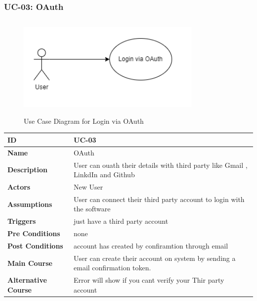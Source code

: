     \subsubsection{UC-03: OAuth}
    \begin{figure}[H]
        \includegraphics[height=5cm, width=0.8\textwidth]{./diagrams/Use Case/u3.png}
        \centering 
        \caption{Use Case Diagram for Login via OAuth}
        \label{Usecase1}
        \end{figure}
        
    \begin{center}
        \begin{tabularx}{\textwidth}{|l|X|}
            \hline
            \textbf{ID} & UC-03 \\
            \hline
            \textbf{Name} & OAuth \\
            \hline
            \textbf{Description} & User can ouath their details with third party like Gmail , LinkdIn and Github \\
            \hline
            \textbf{Actors} & New User \\
            \hline
            \textbf{Assumptions} & User can connect their third party account to login with the software \\
            \hline
            \textbf{Triggers} & just have a third party account  \\
            \hline
            \textbf{Pre Conditions} & none \\
            \hline
            \textbf{Post Conditions} & account has created by confiramtion through email  \\
            \hline
            \textbf{Main Course} & User can create their account on system by sending a email confirmation token. \\
            \hline
            \textbf{Alternative Course} & Error will show if you cant verify your Thir party account \\
            \hline
            
        \end{tabularx}
    \end{center}
    \newpage
    

